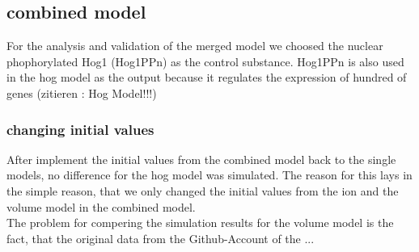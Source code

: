\subsection{combined model}
For the analysis and validation of the merged model we choosed the nuclear phophorylated Hog1 (Hog1PPn) as the control substance. Hog1PPn is also used in the hog model as the output because it regulates the expression of hundred of genes (zitieren : Hog Model!!!)
\subsubsection{changing initial values}
After implement the initial values from the combined model back to the single models, no difference for the hog model was simulated. The reason for this lays in the simple reason, that we only changed the initial values from the ion and the volume model in the combined model.\\
The problem for compering the simulation results for the volume model is the fact, that the original data from the Github-Account of the ...

